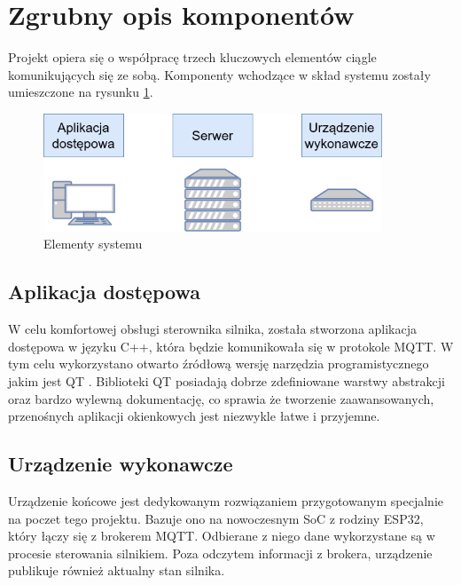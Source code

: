  

 

    \section{Zgrubny opis komponentów}
        Projekt opiera się o współpracę trzech kluczowych elementów ciągle komunikujących się ze sobą. Komponenty wchodzące w skład systemu zostały umieszczone na rysunku \ref{fig:system}.
        
        \begin{figure}[ht]
          \centering
          \includegraphics[width=0.9\textwidth]{img/system.png}
          \caption{Elementy systemu}
          \label{fig:system}
        \end{figure}


        \subsection{Aplikacja dostępowa}
            W celu komfortowej obsługi sterownika silnika, została stworzona aplikacja dostępowa w języku C++, która będzie komunikowała się w protokole MQTT. W tym celu wykorzystano otwarto źródłową wersję narzędzia programistycznego jakim jest QT \cite{qt}. Biblioteki QT posiadają dobrze zdefiniowane warstwy abstrakcji oraz bardzo wylewną dokumentację, co sprawia że tworzenie zaawansowanych, przenośnych aplikacji okienkowych jest niezwykle łatwe i przyjemne.
        
        \subsection{Urządzenie wykonawcze}
            Urządzenie końcowe jest dedykowanym rozwiązaniem przygotowanym specjalnie na poczet tego projektu. Bazuje ono na nowoczesnym SoC z rodziny ESP32, który łączy się z brokerem MQTT. Odbierane z niego dane wykorzystane są w procesie sterowania silnikiem. Poza odczytem informacji z brokera, urządzenie publikuje również aktualny stan silnika.
        
